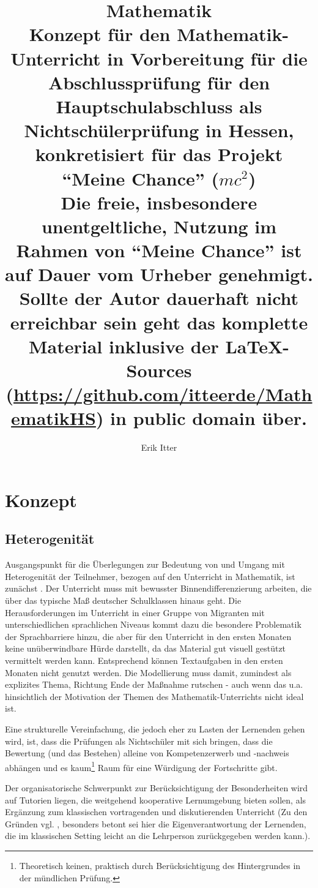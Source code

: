 \documentclass[a4paper]{book}%
\title{Mathematik\\ \vspace{1cm} \normalsize \centering Konzept für den Mathematik-Unterricht in Vorbereitung für die Abschlussprüfung für den Hauptschulabschluss als Nichtschülerprüfung in Hessen, konkretisiert für das Projekt \enquote{Meine Chance} ($mc^2$)\\\vspace{3em}\footnotesize Die freie, insbesondere unentgeltliche, Nutzung im Rahmen von \enquote{Meine Chance} ist auf Dauer vom Urheber genehmigt. Sollte der Autor dauerhaft nicht erreichbar sein geht das komplette Material inklusive der \LaTeX-Sources (\url{https://github.com/itteerde/MathematikHS}) in public domain über.}
\author{Erik Itter}
\theoremstyle{definition}
\begin{document}
\maketitle
\restoregeometry
\tableofcontents

\printglossary[type=symb, style=long]

\part{Konzept}

\chapter{Heterogenität}

Ausgangspunkt für die Überlegungen zur Bedeutung von und Umgang mit Heterogenität der Teilnehmer, bezogen auf den Unterricht in Mathematik, ist zunächst \citep{Leiss2014}. Der Unterricht muss mit bewusster Binnendifferenzierung arbeiten, die über das typische Maß deutscher Schulklassen hinaus geht. Die Herausforderungen im Unterricht in einer Gruppe von Migranten mit unterschiedlichen sprachlichen Niveaus kommt dazu die besondere Problematik der Sprachbarriere hinzu, die aber für den Unterricht in den ersten Monaten keine unüberwindbare Hürde darstellt, da das Material gut visuell gestützt vermittelt werden kann. Entsprechend können Textaufgaben in den ersten Monaten nicht genutzt werden. Die Modellierung muss damit, zumindest als explizites Thema, Richtung Ende der Maßnahme rutschen - auch wenn das u.a. hinsichtlich der Motivation der Themen des Mathematik-Unterrichts nicht ideal ist.

Eine strukturelle Vereinfachung, die jedoch eher zu Lasten der Lernenden gehen wird, ist, dass die Prüfungen als Nichtschüler mit sich bringen, dass die Bewertung (und das Bestehen) alleine von Kompetenzerwerb und -nachweis abhängen und es kaum\footnote{Theoretisch keinen, praktisch durch Berücksichtigung des Hintergrundes in der mündlichen Prüfung.} Raum für eine Würdigung der Fortschritte gibt.

Der organisatorische Schwerpunkt zur Berücksichtigung der Besonderheiten wird auf Tutorien liegen, die weitgehend kooperative Lernumgebung bieten sollen, als Ergänzung zum klassischen vortragenden und diskutierenden Unterricht (Zu den Gründen vgl. \citep[S.7ff]{Leiss2014}, besonders betont sei hier die Eigenverantwortung der Lernenden, die im klassischen Setting leicht an die Lehrperson zurückgegeben werden kann.).
\end{document}
